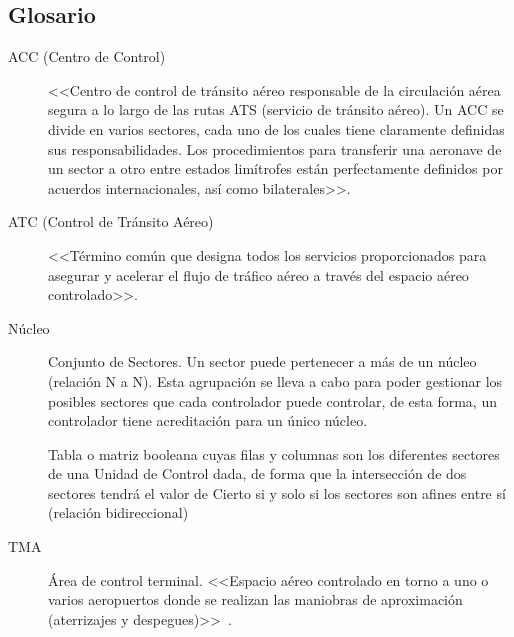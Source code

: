\subsection{Glosario}
\label{sec:Definiciones}
\begin{description}
    \item[ACC (Centro de Control)] \label{ACC}
    <<Centro de control de tránsito aéreo responsable de la circulación aérea segura a lo largo de las rutas ATS (servicio de tránsito aéreo). Un ACC se divide en varios sectores, cada uno de los cuales tiene claramente definidas sus responsabilidades. Los procedimientos para transferir una aeronave de un sector a otro entre estados limítrofes están perfectamente definidos por acuerdos internacionales, así como bilaterales>>.~\cite{ENAIRE-web}

    \item [ATC (Control de Tránsito Aéreo)] \label{ATC} <<Término común que designa todos los servicios proporcionados para asegurar y acelerar el flujo de tráfico aéreo a través del espacio aéreo controlado>>.~\cite{ENAIRE-web}

    \item [Núcleo] \label{Nucleo} Conjunto de Sectores. Un sector puede pertenecer a más de un núcleo (relación N a N). Esta agrupación se lleva a cabo para poder gestionar los posibles sectores que cada controlador puede controlar, de esta forma, un controlador tiene acreditación para un único núcleo.

    \item[] Tabla o matriz booleana cuyas filas y columnas son los diferentes sectores de una Unidad de Control dada, de forma que la intersección de dos sectores tendrá el valor de Cierto si y solo si los sectores son afines entre sí (relación bidireccional)

    \item[TMA] \label{TMA} Área de control terminal. <<Espacio aéreo controlado en torno a uno o varios aeropuertos donde se realizan las maniobras de aproximación (aterrizajes y despegues)>>~\cite{ENAIRE-web}.
\end{description}